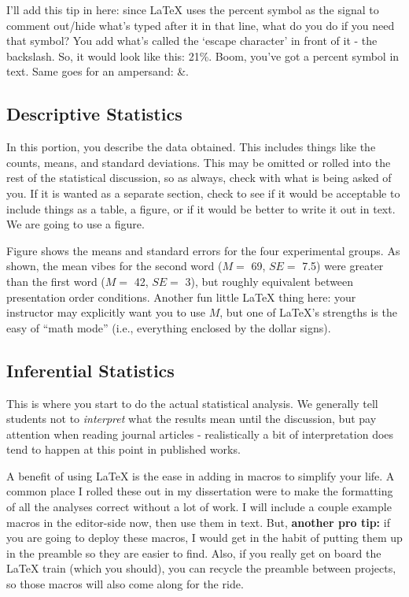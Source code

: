 \documentclass[stu,12pt,floatsintext]{apa7}
\begin{document}
I'll add this tip in here: since \LaTeX{} uses the percent symbol as the signal to comment out/hide what's typed after it in that line, what do you do if you need that symbol? You add what's called the `escape character' in front of it - the backslash. So, it would look like this: 21\%. Boom, you've got a percent symbol in text. Same goes for an ampersand: \&.

\subsection{Descriptive Statistics}

In this portion, you describe the data obtained. This includes things like the counts, means, and standard deviations. This may be omitted or rolled into the rest of the statistical discussion, so as always, check with what is being asked of you. If it is wanted as a separate section, check to see if it would be acceptable to include things as a table, a figure, or if it would be better to write it out in text. We are going to use a figure.



Figure shows the means and standard errors for the four experimental groups. As shown, the mean vibes for the second word (\(M = \) 69, \(SE = \) 7.5) were greater than the first word (\(M = \) 42, \(SE = \) 3), but roughly equivalent between presentation order conditions. Another fun little \LaTeX{} thing here: your instructor may explicitly want you to use \(M\), but one of \LaTeX{}'s strengths is the easy of ``math mode'' (i.e., everything enclosed by the dollar signs). %

\subsection{Inferential Statistics}

This is where you start to do the actual statistical analysis. We generally tell students not to \textit{interpret} what the results mean until the discussion, but pay attention when reading journal articles - realistically a bit of interpretation does tend to happen at this point in published works.

A benefit of using \LaTeX{} is the ease in adding in macros to simplify your life. A common place I rolled these out in my dissertation were to make the formatting of all the analyses correct without a lot of work. I will include a couple example macros in the editor-side now, then use them in text. But, \textbf{another pro tip:} if you are going to deploy these macros, I would get in the habit of putting them up in the preamble so they are easier to find. Also, if you really get on board the \LaTeX{} train (which you should), you can recycle the preamble between projects, so those macros will also come along for the ride.
\end{document}
